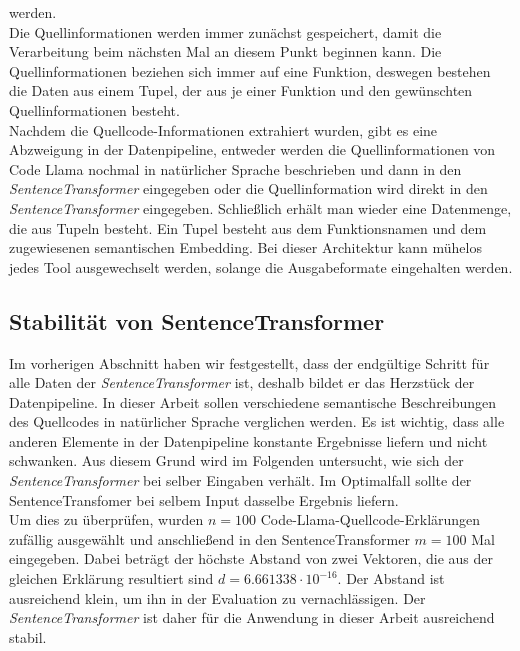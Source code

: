 \documentclass[12pt,letterpaper,ngerman]{article}
\begin{document}
werden.\\
Die Quellinformationen werden immer zunächst gespeichert, damit die 
Verarbeitung beim nächsten Mal an diesem Punkt beginnen kann.
Die Quellinformationen beziehen sich immer auf eine Funktion,
deswegen bestehen die Daten aus einem Tupel, der aus je einer
Funktion und den gewünschten Quellinformationen besteht.\\
Nachdem die Quellcode-Informationen extrahiert wurden, 
gibt es eine Abzweigung in der Datenpipeline, entweder 
werden die Quellinformationen von Code Llama nochmal in natürlicher 
Sprache beschrieben und dann in den \textit{SentenceTransformer}
eingegeben oder die Quellinformation wird direkt in den 
\textit{SentenceTransformer} eingegeben. Schließlich erhält man
wieder eine Datenmenge, die aus Tupeln besteht. Ein Tupel besteht
aus dem Funktionsnamen und dem zugewiesenen semantischen Embedding. 
Bei dieser Architektur kann mühelos jedes Tool ausgewechselt werden,
solange die Ausgabeformate eingehalten werden. 
\subsection{Stabilität von SentenceTransformer}
Im vorherigen Abschnitt haben wir festgestellt, dass der endgültige
Schritt für alle Daten der \textit{SentenceTransformer} ist, deshalb
bildet 
er das Herzstück der Datenpipeline. In dieser Arbeit sollen 
verschiedene semantische Beschreibungen des Quellcodes in 
natürlicher Sprache verglichen werden. Es ist wichtig, dass alle 
anderen Elemente in der Datenpipeline konstante Ergebnisse 
liefern und nicht schwanken. Aus diesem Grund wird im Folgenden 
untersucht, wie sich der \textit{SentenceTransformer} bei selber
Eingaben verhält. Im Optimalfall sollte der SentenceTransfomer bei 
selbem Input dasselbe Ergebnis liefern.\\
Um dies zu überprüfen, wurden $n = 100$ 
Code-Llama-Quellcode-Erklärungen zufällig ausgewählt und 
anschließend in
den SentenceTransformer $m = 100$ Mal eingegeben. Dabei beträgt
der höchste Abstand von zwei Vektoren,
die aus der gleichen Erklärung resultiert sind 
$d = 6.661338\cdot 10^{-16}$. Der 
Abstand ist ausreichend klein, um ihn in der Evaluation zu 
vernachlässigen. Der \textit{SentenceTransformer} ist daher
für die Anwendung in dieser Arbeit ausreichend stabil.

%
\pagebreak
\end{document}
